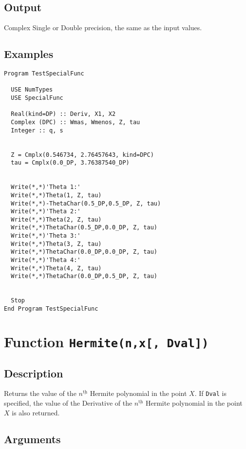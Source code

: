\subsection{Output}

Complex Single or Double precision, the same as the input values.

\subsection{Examples}

\begin{lstlisting}[emph=ThetaChar,
                   emphstyle=\color{blue},
                   frame=trBL,
                   caption=Computing the Jacobi Theta functions with characteristics.,
                   label=thetachar]
Program TestSpecialFunc

  USE NumTypes
  USE SpecialFunc

  Real(kind=DP) :: Deriv, X1, X2
  Complex (DPC) :: Wmas, Wmenos, Z, tau
  Integer :: q, s


  Z = Cmplx(0.546734, 2.76457643, kind=DPC)
  tau = Cmplx(0.0_DP, 3.76387540_DP)


  Write(*,*)'Theta 1:'
  Write(*,*)Theta(1, Z, tau)
  Write(*,*)-ThetaChar(0.5_DP,0.5_DP, Z, tau)
  Write(*,*)'Theta 2:'
  Write(*,*)Theta(2, Z, tau)
  Write(*,*)ThetaChar(0.5_DP,0.0_DP, Z, tau)
  Write(*,*)'Theta 3:'
  Write(*,*)Theta(3, Z, tau)
  Write(*,*)ThetaChar(0.0_DP,0.0_DP, Z, tau)
  Write(*,*)'Theta 4:'
  Write(*,*)Theta(4, Z, tau)
  Write(*,*)ThetaChar(0.0_DP,0.5_DP, Z, tau)
  

  Stop
End Program TestSpecialFunc
\end{lstlisting}

\section{Function \texttt{Hermite(n,x[, Dval])}}

\subsection{Description}

Returns the value of the $n^{\underline{\text{th}}}$ Hermite
polynomial in the point $X$. If \texttt{Dval} is specified, the value
of the Derivative of the $n^{\underline{\text{th}}}$ Hermite
polynomial in the point $X$ is also returned.

\subsection{Arguments}

